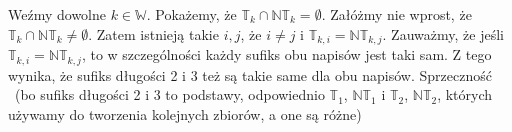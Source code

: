 Weźmy dowolne $k \in \mathbb{W}$. Pokażemy, że $\mathbb{T}_k \cap \mathbb{NT}_k = \emptyset$.
Załóżmy nie wprost, że $\mathbb{T}_k \cap \mathbb{NT}_k \neq \emptyset$. Zatem istnieją takie $i, j$, że $i \neq j$ i $\mathbb{T}_{k, i} = \mathbb{NT}_{k, j}$. Zauważmy, że jeśli $\mathbb{T}_{k, i} = \mathbb{NT}_{k, j}$, to w szczególności każdy sufiks obu napisów jest taki sam. Z tego wynika, że sufiks długości 2 i 3 też są takie same dla obu napisów. Sprzeczność \lightning (bo sufiks długości 2 i 3 to podstawy, odpowiednio $\mathbb{T}_1$, $\mathbb{NT}_1$ i $\mathbb{T}_2$, $\mathbb{NT}_2$, których używamy do tworzenia kolejnych zbiorów, a one są różne)